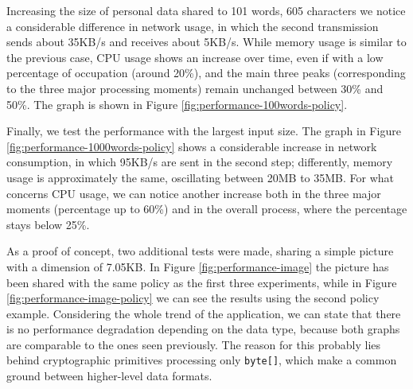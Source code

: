 Increasing the size of personal data shared to 101 words, 605 characters we notice a considerable difference in network usage, in which the second transmission sends about 35KB/s and receives about 5KB/s. While memory usage is similar to the previous case, CPU usage shows an increase over time, even if with a low percentage of occupation (around 20\%), and the main three peaks (corresponding to the three major processing moments) remain unchanged between 30\% and 50\%. The graph is shown in Figure \ref{fig:performance-100words-policy}.

Finally, we test the performance with the largest input size. The graph in Figure \ref{fig:performance-1000words-policy} shows a considerable increase in network consumption, in which 95KB/s are sent in the second step; differently, memory usage is approximately the same, oscillating between 20MB to 35MB. For what concerns CPU usage, we can notice another increase both in the three major moments (percentage up to 60\%) and in the overall process, where the percentage stays below 25\%.

As a proof of concept, two additional tests were made, sharing a simple picture with a dimension of 7.05KB. In Figure \ref{fig:performance-image} the picture has been shared with the same policy as the first three experiments, while in Figure \ref{fig:performance-image-policy} we can see the results using the second policy example. Considering the whole trend of the application, we can state that there is no performance degradation depending on the data type, because both graphs are comparable to the ones seen previously. The reason for this probably lies behind cryptographic primitives processing only \texttt{byte[]}, which make a common ground between higher-level data formats.